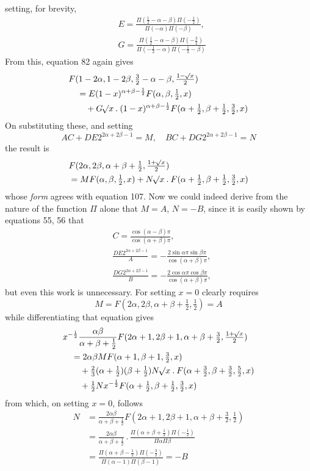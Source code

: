 setting, for brevity,
\[
\begin{aligned}&E=\frac{\Pi(\tfrac12-\alpha-\beta)\Pi(-\tfrac12)}{\Pi(-\alpha)\Pi(-\beta)},\\&
G=\frac{\Pi(\tfrac12-\alpha-\beta)\Pi(-\tfrac32)}{\Pi(-\tfrac12-\alpha)\Pi(-\tfrac12-\beta)}\end{aligned}
\]
From this, equation 82 again gives
\[
\begin{aligned}
&F(1-2\alpha,1-2\beta,\tfrac32-\alpha-\beta,\tfrac{1-\mathord{{}^{}\!\surd}x}2)\\
&\quad=E(1-x)^{\alpha+\beta-\frac12}F(\alpha,\beta,\tfrac12,x)\\&\qquad+G\mathord{{}^{}\!\surd}x\mathbin{.}(1-x)^{\alpha+\beta-\frac12}F(\alpha+\tfrac12,\beta+\tfrac12,\tfrac32,x)
\end{aligned}
\]
On substituting these, and setting
\[
AC+DE2^{2\alpha+2\beta-1}=M,\quad BC+DG2^{2\alpha+2\beta-1}=N
\]
the result is
\[
\begin{aligned}&F(2\alpha,2\beta,\alpha+\beta+\tfrac12,\tfrac{1+\mathord{{}^{}\!\surd}x}2)\\&=MF(\alpha,\beta,\tfrac12,x)+N\mathord{{}^{}\!\surd}x\mathbin{.}F(\alpha+\tfrac12,\beta+\tfrac12,\tfrac32,x)\end{aligned}
\]
whose \textit{form} agrees with equation 107. Now we could indeed derive from the nature of the function $\Pi$ alone that $M=A$, $N=-B$, since it is easily shown by equations 55, 56 that
\[
\begin{aligned}&C=\frac{\cos(\alpha-\beta)\pi}{\cos(\alpha+\beta)\pi},\\&
\frac{DE2^{2\alpha+2\beta-1}}A=-\frac{2\sin\alpha\pi\sin\beta\pi}{\cos(\alpha+\beta)\pi},\\&
\frac{DG2^{2\alpha+2\beta-1}}B=-\frac{2\cos\alpha\pi\cos\beta\pi}{\cos(\alpha+\beta)\pi},\end{aligned}
\]
but even this work is unnecessary. For setting $x=0$ clearly requires
\[
M=F(2\alpha,2\beta,\alpha+\beta+\tfrac12,\tfrac12)=A
\]
while differentiating that equation gives
\[
\begin{aligned}
&x^{-\frac12}\frac{\alpha\beta}{\alpha+\beta+\tfrac12}F(2\alpha+1,2\beta+1,\alpha+\beta+\tfrac32,\tfrac{1+\mathord{{}^{}\!\surd}x}2)\\
&\quad=2\alpha\beta MF(\alpha+1,\beta+1,\tfrac32,x)\\
&\qquad+\tfrac23(\alpha+\tfrac12)(\beta+\tfrac12)N\mathord{{}^{}\!\surd}x\mathbin{.}F(\alpha+\tfrac32,\beta+\tfrac32,\tfrac52,x)\\&\qquad+\tfrac12Nx^{-\frac12}F(\alpha+\tfrac12,\beta+\tfrac12,\tfrac32,x)
\end{aligned}
\]
from which, on setting $x=0$, follows
\[
\begin{aligned}
N&=\frac{2\alpha\beta}{\alpha+\beta+\tfrac12}F(2\alpha+1,2\beta+1,\alpha+\beta+\tfrac32,\tfrac12)\\
&=\frac{2\alpha\beta}{\alpha+\beta+\tfrac12}\mathbin{.}\frac{\Pi(\alpha+\beta+\tfrac12)\Pi(-\tfrac12)}{\Pi\alpha\Pi\beta}\\
&=\frac{\Pi(\alpha+\beta-\tfrac12)\Pi(-\tfrac32)}{\Pi(\alpha-1)\Pi(\beta-1)}=-B
\end{aligned}
\]
